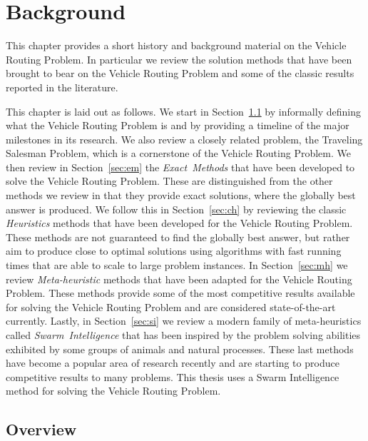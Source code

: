 
\chapter{Background}
\label{chap:background}

This chapter provides a short history and background material on the Vehicle Routing Problem. In particular we review the solution methods that have been brought to bear on the Vehicle Routing Problem and some of the classic results reported in the literature.

This chapter is laid out as follows. We start in Section~\ref{sec:vo} by informally defining what the Vehicle Routing Problem is and by providing a timeline of the major milestones in its research. We also review a closely related problem, the Traveling Salesman Problem, which is a cornerstone of the Vehicle Routing Problem. We then review in Section~\ref{sec:em} the \emph{Exact~Methods} that have been developed to solve the Vehicle Routing Problem. These are distinguished from the other methods we review in that they provide exact solutions, where the globally best answer is produced. We follow this in Section~\ref{sec:ch} by reviewing the classic \emph{Heuristics} methods that have been developed for the Vehicle Routing Problem. These methods are not guaranteed to find the globally best answer, but rather aim to produce close to optimal solutions using algorithms with fast running times that are able to scale to large problem instances. In Section~\ref{sec:mh} we review \emph{Meta-heuristic} methods that have been adapted for the Vehicle Routing Problem. These methods provide some of the most competitive results available for solving the Vehicle Routing Problem and are considered state-of-the-art currently. Lastly, in Section~\ref{sec:si} we review a modern family of meta-heuristics called \emph{Swarm~Intelligence} that has been inspired by the problem solving abilities exhibited by some groups of animals and natural processes. These last methods have become a popular area of research recently and are starting to produce competitive results to many problems. This thesis uses a Swarm Intelligence method for solving the Vehicle Routing Problem.

\section{Overview}
\label{sec:vo}


